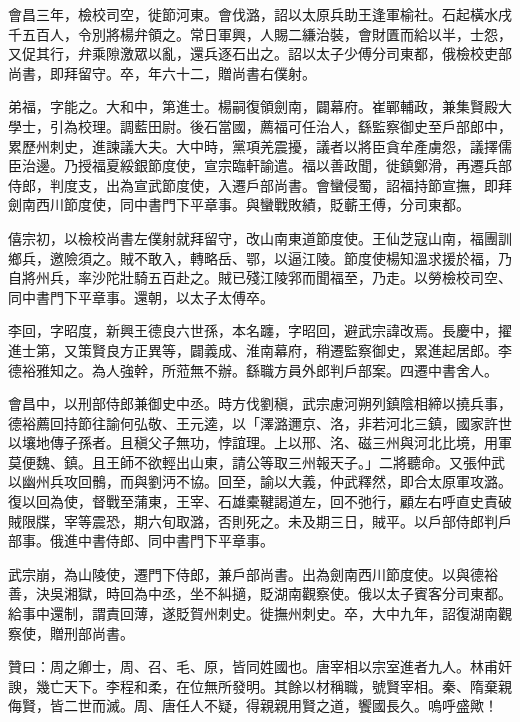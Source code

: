 \begin{pinyinscope}
 會昌三年，檢校司空，徙節河東。會伐潞，詔以太原兵助王逢軍榆社。石起橫水戌千五百人，令別將楊弁領之。常日軍興，人賜二縑治裝，會財匱而給以半，士怨，又促其行，弁乘隙激眾以亂，還兵逐石出之。詔以太子少傅分司東都，俄檢校吏部尚書，即拜留守。卒，年六十二，贈尚書右僕射。



 弟福，字能之。大和中，第進士。楊嗣復領劍南，闢幕府。崔鄲輔政，兼集賢殿大學士，引為校理。調藍田尉。後石當國，薦福可任治人，繇監察御史至戶部郎中，累歷州刺史，進諫議大夫。大中時，黨項羌震擾，議者以將臣貪牟產虜怨，議擇儒臣治邊。乃授福夏綏銀節度使，宣宗臨軒諭遣。福以善政聞，徙鎮鄭滑，再遷兵部侍郎，判度支，出為宣武節度使，入遷戶部尚書。會蠻侵蜀，詔福持節宣撫，即拜劍南西川節度使，同中書門下平章事。與蠻戰敗績，貶蘄王傅，分司東都。



 僖宗初，以檢校尚書左僕射就拜留守，改山南東道節度使。王仙芝寇山南，福團訓鄉兵，邀險須之。賊不敢入，轉略岳、鄂，以逼江陵。節度使楊知溫求援於福，乃自將州兵，率沙陀壯騎五百赴之。賊已殘江陵郛而聞福至，乃走。以勞檢校司空、同中書門下平章事。還朝，以太子太傅卒。



 李回，字昭度，新興王德良六世孫，本名躔，字昭回，避武宗諱改焉。長慶中，擢進士第，又策賢良方正異等，闢義成、淮南幕府，稍遷監察御史，累進起居郎。李德裕雅知之。為人強幹，所蒞無不辦。繇職方員外郎判戶部案。四遷中書舍人。



 會昌中，以刑部侍郎兼御史中丞。時方伐劉稹，武宗慮河朔列鎮陰相締以撓兵事，德裕薦回持節往諭何弘敬、王元逵，以「澤潞邇京、洛，非若河北三鎮，國家許世以壤地傳子孫者。且稹父子無功，悖誼理。上以邢、洺、磁三州與河北比境，用軍莫便魏、鎮。且王師不欲輕出山東，請公等取三州報天子。」二將聽命。又張仲武以幽州兵攻回鶻，而與劉沔不協。回至，諭以大義，仲武釋然，即合太原軍攻潞。復以回為使，督戰至蒲東，王宰、石雄橐鞬謁道左，回不弛行，顧左右呼直史責破賊限牒，宰等震恐，期六旬取潞，否則死之。未及期三日，賊平。以戶部侍郎判戶部事。俄進中書侍郎、同中書門下平章事。



 武宗崩，為山陵使，遷門下侍郎，兼戶部尚書。出為劍南西川節度使。以與德裕善，決吳湘獄，時回為中丞，坐不糾擿，貶湖南觀察使。俄以太子賓客分司東都。給事中還制，謂責回薄，遂貶賀州刺史。徙撫州刺史。卒，大中九年，詔復湖南觀察使，贈刑部尚書。



 贊曰：周之卿士，周、召、毛、原，皆同姓國也。唐宰相以宗室進者九人。林甫奸諛，幾亡天下。李程和柔，在位無所發明。其餘以材稱職，號賢宰相。秦、隋棄親侮賢，皆二世而滅。周、唐任人不疑，得親親用賢之道，饗國長久。嗚呼盛歟！



\end{pinyinscope}